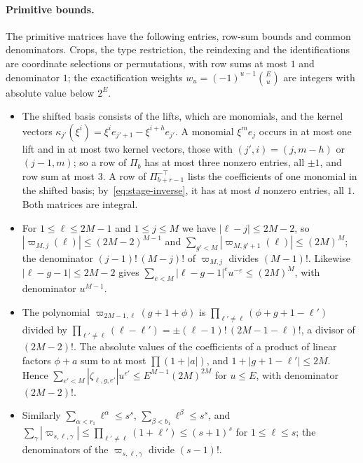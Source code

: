 \paragraph{Primitive bounds.}
The primitive matrices have the following entries, row-sum bounds and
common denominators. Crops, the type restriction, the reindexing and the
identifications are coordinate selections or permutations, with row sums
at most \(1\) and denominator \(1\); the exactification weights
\(w_u=(-1)^{u-1}\binom Eu\) are integers with absolute value below
\(2^E\).
\begin{itemize}
\item The shifted basis consists of the lifts, which are monomials, and
 the kernel vectors
 \(\kappa_{j'}(\xi^i)=\xi^ie_{j'+1}-\xi^{i+h}e_{j'}\). A monomial
 \(\xi^me_j\) occurs in at most one lift and in at most two kernel
 vectors, those with \((j',i)=(j,m-h)\) or \((j-1,m)\); so a row of
 \(\Pi_b\) has at most three nonzero entries, all \(\pm1\), and row sum
 at most \(3\). A row of \(\Pi_{b+r-1}^{-\top}\) lists the coefficients of
 one monomial in the shifted basis; by~\eqref{eq:stage-inverse}, it has at
 most \(d\) nonzero entries, all \(1\). Both matrices are integral.
\item For \(1\le\ell\le2M-1\) and \(1\le j\le M\) we have
 \(|\ell-j|\le2M-2\), so
 \(|\varpi_{M,j}(\ell)|\le(2M-2)^{M-1}\) and
 \(\sum_{g'<M}|\varpi_{M,g'+1}(\ell)|\le(2M)^M\); the denominator
 \((j-1)!\,(M-j)!\) of \(\varpi_{M,j}\) divides \((M-1)!\). Likewise
 \(|\ell-g-1|\le2M-2\) gives \(\sum_{e<M}|\ell-g-1|^eu^{-e}\le(2M)^M\),
 with denominator \(u^{M-1}\).
\item The polynomial \(\varpi_{2M-1,\ell}(g+1+\phi)\) is
 \(\prod_{\ell'\ne\ell}(\phi+g+1-\ell')\) divided by
 \(\prod_{\ell'\ne\ell}(\ell-\ell')=\pm(\ell-1)!\,(2M-1-\ell)!\), a divisor
 of \((2M-2)!\). The absolute values of the coefficients of a product of
 linear factors \(\phi+a\) sum to at most \(\prod(1+|a|)\), and
 \(1+|g+1-\ell'|\le2M\). Hence
 \(\sum_{e'<M}|\zeta_{\ell,g,e'}|u^{e'}\le E^{M-1}(2M)^{2M}\) for
 \(u\le E\), with denominator \((2M-2)!\).
\item Similarly \(\sum_{\alpha<r_1}\ell^\alpha\le s^s\),
 \(\sum_{\beta<b_1}\ell^\beta\le s^s\), and
 \(\sum_\gamma|\varpi_{s,\ell,\gamma}|\le\prod_{\ell'\ne\ell}(1+\ell')\le(s+1)^s\)
 for \(1\le\ell\le s\); the denominators of the \(\varpi_{s,\ell,\gamma}\)
 divide \((s-1)!\).
\end{itemize}

